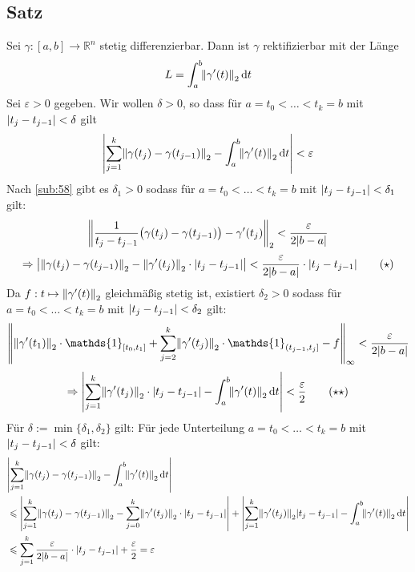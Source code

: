 \subsection[Satz über Rektifizierbarkeit]{Satz} %
\label{sub:59}
Sei $\gamma : [a,b] \to \mathds{R}^n$ stetig differenzierbar. Dann ist $\gamma$ rektifizierbar mit der Länge 
\[
	L = \int_{a} ^{b} \! \norm[2]{\gamma'(t)}  \, \mathrm{d}t 
\]
Sei $\varepsilon >0$ gegeben. Wir wollen $\delta >0$, so dass für $a= t_0< \ldots < t_k =b$ mit $\abs*{t_j - t_{j-1}}< \delta  $ gilt
\[
	\abs*{ \sum_{j=1}^{k}  \norm[2]{\gamma (t_j) - \gamma (t_{j-1})}  - \int_{a} ^{b} \! \norm[2]{\gamma'(t)}  \, \mathrm{d}t } < \varepsilon
\]
Nach \ref{sub:58} gibt es $\delta_1 >0$ sodass für $a= t_0< \ldots < t_k =b$ mit  $\abs*{t_j - t_{j-1}}< \delta_1$ gilt:
\[
	\norm[2]{\frac{1}{t_j - t_{j-1}} \big( \gamma(t_j) - \gamma(t_{j-1}) \big) - \gamma'(t_j)  } < \frac{\varepsilon}{2 \abs*{b-a} }  
\]
\[
	\Rightarrow \abs*{\norm[2]{ \gamma(t_j) - \gamma(t_{j-1}) } - \norm[2]{\gamma'(t_j)}  \cdot  \abs*{ t_j - t_{j-1}}}  < \frac{\varepsilon}{2 \abs*{b-a} } \cdot 
	\abs*{t_j - t_{j-1}} \tag{$\star$}
\]   
Da $f : t \mapsto \norm[2]{\gamma'(t)} $ gleichmäßig stetig ist, existiert $\delta_2 >0$ sodass für $a= t_0< \ldots < t_k =b$ mit  $\abs*{t_j - t_{j-1}}< \delta_2$ gilt:
\[
	\norm[\infty]{ \norm[2]{\gamma'(t_1)} \cdot \mathds{1}_{[t_0, t_1]}  + \sum_{j=2}^{k}  \norm[2]{\gamma'(t_j)} \cdot \mathds{1}_{(t_{j-1},t_j]}  - f
	}  < \frac{\varepsilon}{2 \abs*{b-a} } 
\]
\[
	\Rightarrow  \abs*{\sum_{j=1}^{k}  \norm[2]{\gamma'(t_j)} \cdot \abs*{t_j - t_{j-1}} - \int_{a} ^{b} \! \norm[2]{\gamma'(t)}  \, \mathrm{d}t   } < \frac{\varepsilon}{2}
	\tag{$\star \star$} 
\]
Für $\delta := \min \{\delta_1, \delta_2\}$ gilt: Für jede Unterteilung $a= t_0< \ldots < t_k =b$ mit  $\abs*{t_j - t_{j-1}}< \delta$ gilt:
\begin{align*}
	& \abs*{ \sum_{j=1}^{k}  \norm[2]{\gamma(t_j) - \gamma(t_{j-1})} - \int_{a} ^{b} \! \norm[2]{\gamma'(t)}  \, \mathrm{d}t  }   \\
	&\le \abs*{\sum_{j=1}^{k} \norm[2]{\gamma(t_j) - \gamma(t_{j-1})}  - \sum_{j=0}^{k} \norm[2]{\gamma'(t_j)} \cdot  \abs*{t_j - t_{j-1}}    } 
	+ \abs*{\sum_{j=1}^{k}  \norm[2]{\gamma'(t_j)} \abs*{t_j - t_{j-1}} - \int_{a} ^{b} \! \norm[2]{\gamma'(t)}  \, \mathrm{d}t   } \\
	&\le \sum_{j=1}^{k}  \frac{\varepsilon}{2 \abs*{b-a} } \cdot  \abs*{t_j - t_{j-1}} + \frac{\varepsilon}{2} = \varepsilon     
\end{align*}

